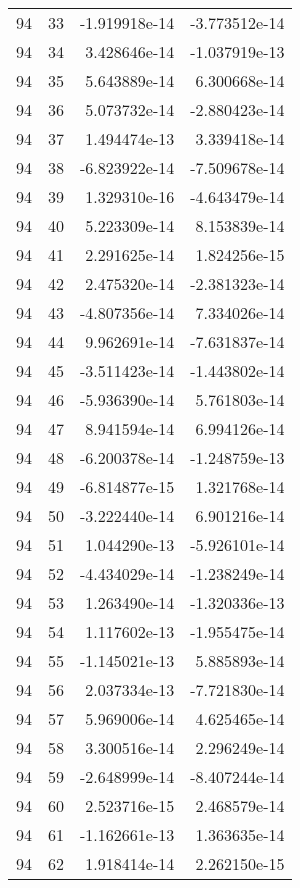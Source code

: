 \begin{tabular}{rrrr}
  94 &   33 & -1.919918e-14 & -3.773512e-14 \\
  94 &   34 &  3.428646e-14 & -1.037919e-13 \\
  94 &   35 &  5.643889e-14 &  6.300668e-14 \\
  94 &   36 &  5.073732e-14 & -2.880423e-14 \\
  94 &   37 &  1.494474e-13 &  3.339418e-14 \\
  94 &   38 & -6.823922e-14 & -7.509678e-14 \\
  94 &   39 &  1.329310e-16 & -4.643479e-14 \\
  94 &   40 &  5.223309e-14 &  8.153839e-14 \\
  94 &   41 &  2.291625e-14 &  1.824256e-15 \\
  94 &   42 &  2.475320e-14 & -2.381323e-14 \\
  94 &   43 & -4.807356e-14 &  7.334026e-14 \\
  94 &   44 &  9.962691e-14 & -7.631837e-14 \\
  94 &   45 & -3.511423e-14 & -1.443802e-14 \\
  94 &   46 & -5.936390e-14 &  5.761803e-14 \\
  94 &   47 &  8.941594e-14 &  6.994126e-14 \\
  94 &   48 & -6.200378e-14 & -1.248759e-13 \\
  94 &   49 & -6.814877e-15 &  1.321768e-14 \\
  94 &   50 & -3.222440e-14 &  6.901216e-14 \\
  94 &   51 &  1.044290e-13 & -5.926101e-14 \\
  94 &   52 & -4.434029e-14 & -1.238249e-14 \\
  94 &   53 &  1.263490e-14 & -1.320336e-13 \\
  94 &   54 &  1.117602e-13 & -1.955475e-14 \\
  94 &   55 & -1.145021e-13 &  5.885893e-14 \\
  94 &   56 &  2.037334e-13 & -7.721830e-14 \\
  94 &   57 &  5.969006e-14 &  4.625465e-14 \\
  94 &   58 &  3.300516e-14 &  2.296249e-14 \\
  94 &   59 & -2.648999e-14 & -8.407244e-14 \\
  94 &   60 &  2.523716e-15 &  2.468579e-14 \\
  94 &   61 & -1.162661e-13 &  1.363635e-14 \\
  94 &   62 &  1.918414e-14 &  2.262150e-15 \\

\end{tabular}
